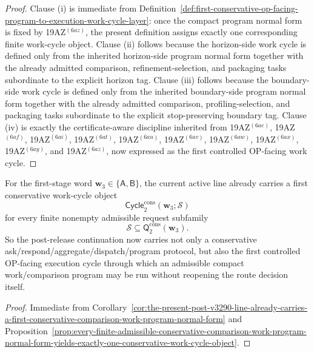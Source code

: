 \begin{proof}
Clause (i) is immediate from Definition~\ref{def:first-conservative-op-facing-program-to-execution-work-cycle-layer}: once the compact program normal form is fixed by 19AZ$^{(6az)}$, the present definition assigns exactly one corresponding finite work-cycle object. Clause (ii) follows because the horizon-side work cycle is defined only from the inherited horizon-side program normal form together with the already admitted comparison, refinement-selection, and packaging tasks subordinate to the explicit horizon tag. Clause (iii) follows because the boundary-side work cycle is defined only from the inherited boundary-side program normal form together with the already admitted comparison, profiling-selection, and packaging tasks subordinate to the explicit stop-preserving boundary tag. Clause (iv) is exactly the certificate-aware discipline inherited from 19AZ$^{(6ae)}$, 19AZ$^{(6af)}$, 19AZ$^{(6ai)}$, 19AZ$^{(6at)}$, 19AZ$^{(6au)}$, 19AZ$^{(6av)}$, 19AZ$^{(6aw)}$, 19AZ$^{(6ax)}$, 19AZ$^{(6ay)}$, and 19AZ$^{(6az)}$, now expressed as the first controlled OP-facing work cycle.
\end{proof}

\begin{corollary}
\label{cor:the-present-post-v3290-line-already-carries-a-first-conservative-work-cycle}
For the first-stage word \(\mathbf w_3\in\{\mathsf A,\mathsf B\}\), the current active line already carries a first conservative work-cycle object
\[
 \mathsf{Cycle}^{\mathrm{cons}}_{2}(\mathbf w_3;\mathcal S)
\]
for every finite nonempty admissible request subfamily
\[
 \mathcal S\subseteq \mathsf{Q}^{\mathrm{cons}}_{2}(\mathbf w_3).
\]
So the post-release continuation now carries not only a conservative ask/respond/aggregate/dispatch/program protocol, but also the first controlled OP-facing execution cycle through which an admissible compact work/comparison program may be run without reopening the route decision itself.
\end{corollary}

\begin{proof}
Immediate from Corollary~\ref{cor:the-present-post-v3290-line-already-carries-a-first-conservative-comparison-work-program-normal-form} and Proposition~\ref{prop:every-finite-admissible-conservative-comparison-work-program-normal-form-yields-exactly-one-conservative-work-cycle-object}.
\end{proof}

